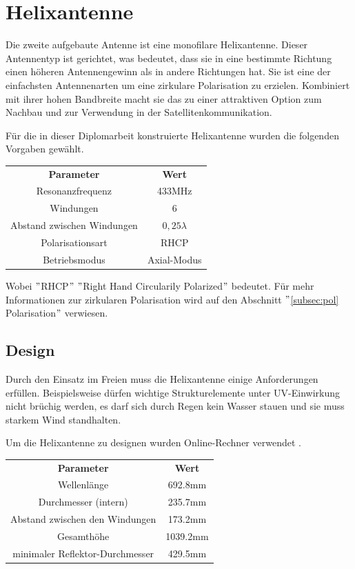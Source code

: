 \chapter{Helixantenne}
\label{chap:helix}
Die zweite aufgebaute Antenne ist eine monofilare Helixantenne. Dieser Antennentyp ist gerichtet, was bedeutet, dass sie in eine bestimmte Richtung einen höheren Antennengewinn als in andere Richtungen hat. Sie ist eine der einfachsten Antennenarten um eine zirkulare Polarisation zu erzielen. Kombiniert mit ihrer hohen Bandbreite macht sie das zu einer attraktiven Option zum Nachbau und zur Verwendung in der Satellitenkommunikation. \cite{helixWebsite}

Für die in dieser Diplomarbeit konstruierte Helixantenne wurden die folgenden Vorgaben gewählt.

\begin{center}
	\begin{tabular}{|c|c|}
	\textbf{Parameter} & \textbf{Wert}\\
	Resonanzfrequenz & 433MHz\\
	Windungen & 6\\
	Abstand zwischen Windungen & $0,25\lambda$\\
	Polarisationsart & RHCP\\
	Betriebsmodus & Axial-Modus
\end{tabular}
\end{center}

Wobei $"$RHCP$"$ $"$Right Hand Circularily Polarized$"$ bedeutet. Für mehr Informationen zur zirkularen Polarisation wird auf den Abschnitt $"$\ref{subsec:pol} Polarisation$"$ verwiesen.

\section{Design}
Durch den Einsatz im Freien muss die Helixantenne einige Anforderungen erfüllen. Beispielsweise dürfen wichtige Strukturelemente unter UV-Einwirkung nicht brüchig werden, es darf sich durch Regen kein Wasser stauen und sie muss starkem Wind standhalten. 

Um die Helixantenne zu designen wurden Online-Rechner verwendet \cite{calculator_daycounter, calculator_jcoppens}.

\begin{center}
	\begin{tabular}{|c|c|}
	\textbf{Parameter} & \textbf{Wert} \\
	Wellenlänge &  692.8mm\\
	Durchmesser (intern) & 235.7mm\\
	Abstand zwischen den Windungen & 173.2mm\\
	Gesamthöhe & 1039.2mm\\
	minimaler Reflektor-Durchmesser & 429.5mm
\end{tabular}
\end{center}

